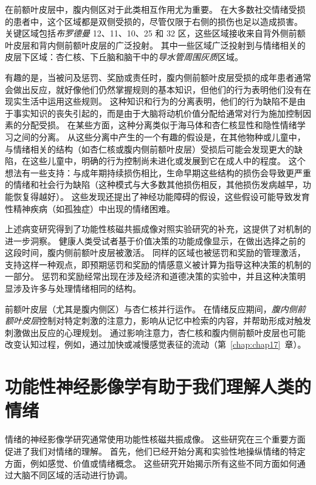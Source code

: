 在前额叶皮层中，腹内侧区对于此类相互作用尤为重要。
在大多数社交情绪受损的患者中，这个区域都是双侧受损的，尽管仅限于右侧的损伤也足以造成损害。
关键区域包括\textit{布罗德曼} 12、11、10、25 和 32 区，这些区域接收来自背外侧前额叶皮层和背内侧前额叶皮层的广泛投射。
其中一些区域广泛投射到与情绪相关的皮层下区域：杏仁核、下丘脑和脑干中的\textit{导水管周围灰质}区域。


有趣的是，当被问及惩罚、奖励或责任时，腹内侧前额叶皮层受损的成年患者通常会做出反应，就好像他们仍然掌握规则的基本知识，但他们的行为表明他们没有在现实生活中运用这些规则。
这种知识和行为的分离表明，他们的行为缺陷不是由于事实知识的丧失引起的，而是由于大脑将动机价值分配给通常对行为施加控制因素的分配受损。
在某些方面，这种分离类似于海马体和杏仁核显性和隐性情绪学习之间的分离。
从这些分离中产生的一个有趣的假设是，在其他物种或儿童中，与情绪相关的结构（如杏仁核或腹内侧前额叶皮层）受损后可能会发现更大的缺陷，在这些儿童中，明确的行为控制尚未进化或发展到它在成人中的程度。
这个想法有一些支持：与成年期持续损伤相比，生命早期这些结构的损伤会导致更严重的情绪和社会行为缺陷（这种模式与大多数其他损伤相反，其他损伤发病越早，功能恢复得越好）。
这些发现还提出了神经功能障碍的假设，这些假设可能导致发育性精神疾病（如孤独症）中出现的情绪困难。


上述病变研究得到了功能性核磁共振成像对照实验研究的补充，这提供了对机制的进一步洞察。
健康人类受试者基于价值决策的功能成像显示，在做出选择之前的这段时间，腹内侧前额叶皮层被激活。
同样的区域也被惩罚和奖励的管理激活，支持这样一种观点，即预期惩罚和奖励的情感意义被计算为指导这种决策的机制的一部分。
惩罚和奖励经常出现在涉及经济和道德决策的实验中，并且这种决策明显涉及许多与处理情绪相同的结构。


前额叶皮层（尤其是腹内侧区）与杏仁核并行运作。
在情绪反应期间，\textit{腹内侧前额叶皮层}控制对特定刺激的注意力，影响从记忆中检索的内容，并帮助形成对触发刺激做出反应的心理规划。
通过影响注意力，杏仁核和腹内侧前额叶皮层也可能改变认知过程，例如，通过加快或减慢感觉表征的流动（第~\ref{chap:chap17}~章）。


\section{功能性神经影像学有助于我们理解人类的情绪}

情绪的神经影像学研究通常使用功能性核磁共振成像。
这些研究在三个重要方面促进了我们对情绪的理解。
首先，他们已经开始分离和实验性地操纵情绪的特定方面，例如感觉、价值或情绪概念。
这些研究开始揭示所有这些不同方面如何通过大脑不同区域的活动进行协调。


